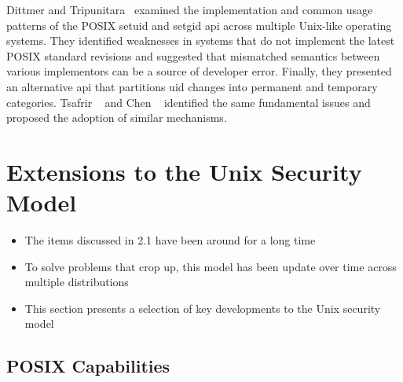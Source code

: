 Dittmer and Tripunitara~\cite{dittmer2014_setuid} examined the implementation and common
usage patterns of the POSIX setuid and setgid \gls{api} across multiple Unix-like operating
systems. They identified weaknesses in systems that do not implement the latest POSIX
standard revisions and suggested that mismatched semantics between various implementors
can be a source of developer error. Finally, they presented an alternative \gls{api} that
partitions \gls{uid} changes into permanent and temporary categories. Tsafrir
\etal~\cite{tsafrir2008_setuid} and Chen \etal~\cite{chen2002_setuid} identified the same
fundamental issues and proposed the adoption of similar mechanisms.


%



\section{Extensions to the Unix Security Model}%
\label{s:security-extensions}


\begin{inprogress}
  \begin{itemize}
    \item The items discussed in 2.1 have been around for a long time
    \item To solve problems that crop up, this model has been update over time across multiple distributions
    \item This section presents a selection of key developments to the Unix security model
  \end{itemize}
\end{inprogress}


\subsection{POSIX Capabilities}

